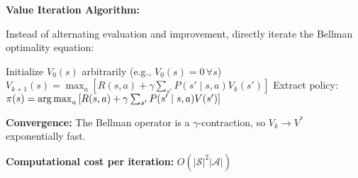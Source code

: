 \begin{seanbox}{5.4}
\textbf{Value Iteration Algorithm:}

Instead of alternating evaluation and improvement, directly iterate the Bellman optimality equation:

\begin{algorithmic}[1]
\State Initialize $V_0(s)$ arbitrarily (e.g., $V_0(s) = 0 \, \forall s$)
        \State $V_{k+1}(s) = \max_a \left[ R(s,a) + \gamma \sum_{s'} P(s' \mid s, a) V_k(s') \right]$
    \EndFor
\EndFor
\State Extract policy: $\pi(s) = \operatorname*{arg\,max}_a \left[ R(s,a) + \gamma \sum_{s'} P(s' \mid s, a) V(s') \right]$
\end{algorithmic}

\textbf{Convergence:} The Bellman operator is a $\gamma$-contraction, so $V_k \to V^*$ exponentially fast.

\textbf{Computational cost per iteration:} $O(|\mathcal{S}|^2 |\mathcal{A}|)$
\end{seanbox}

